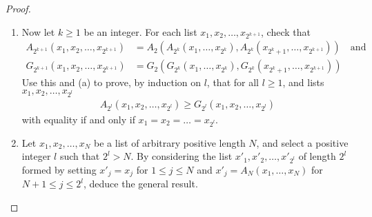 \documentclass[11pt]{article}
\begin{document}
\begin{enumerate}[label=(\roman*)]
\begin{proof}
\begin{enumerate}[label=(\alph*)]
      \item Now let \(k \geq 1\) be an integer.  For each list \(x_1, x_2, \dots, x_{2^{k+1}}\), check that
        \begin{align*}
          A_{2^{k+1}}(x_1, x_2, \dots, x_{2^{k+1}}) &= A_2 (A_{2^k} (x_1, \dots, x_{2^k}), 
          A_{2^k} (x_{2^k + 1}, \dots, x_{2^{k+1}})) \quad \text{and} \\
          G_{2^{k+1}}(x_1, x_2, \dots, x_{2^{k+1}}) &= G_2 (G_{2^k} (x_1, \dots, x_{2^k}), 
          G_{2^k} (x_{2^k + 1}, \dots, x_{2^{k+1}}))
        \end{align*}
        Use this and (a) to prove, by induction on \(l\), that for all \(l \geq 1\), and lists \(x_1, x_2, \dots, x_{2^l}\)
        \begin{align*}
          A_{2^l} (x_1, x_2, \dots, x_{2^l}) \geq G_{2^l} (x_1, x_2, \dots, x_{2^l})
        \end{align*}
        with equality if and only if \(x_1 = x_2 = \ldots = x_{2^l}\).

        
      \item Let \(x_1, x_2, \dots, x_N\) be a list of arbitrary positive length \(N\), and select a positive integer \(l\)
        such that \(2^l > N\).  By considering the list \(x'_1, x'_2, \dots, x'_{2^l}\) of length \(2^l\) formed by setting 
        \(x'_j = x_j\) for \(1 \leq j \leq N\) and \(x'_j = A_N(x_1, \dots, x_N)\) for \(N+1 \leq j \leq 2^l\), deduce the 
        general result.
    \end{enumerate}
  \end{proof}
 \end{enumerate}
\end{document}
